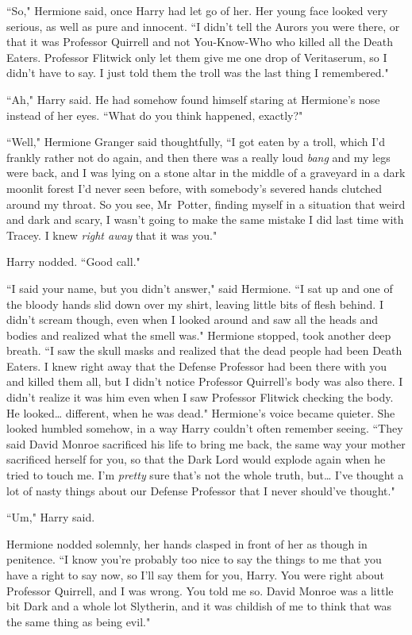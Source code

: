 ``So," Hermione said, once Harry had let go of her. Her young face looked very serious, as well as pure and innocent. ``I didn't tell the Aurors you were there, or that it was Professor Quirrell and not You-Know-Who who killed all the Death Eaters. Professor Flitwick only let them give me one drop of Veritaserum, so I didn't have to say. I just told them the troll was the last thing I remembered."

``Ah," Harry said. He had somehow found himself staring at Hermione's nose instead of her eyes. ``What do you think happened, exactly?"

``Well," Hermione Granger said thoughtfully, ``I got eaten by a troll, which I'd frankly rather not do again, and then there was a really loud \emph{bang} and my legs were back, and I was lying on a stone altar in the middle of a graveyard in a dark moonlit forest I'd never seen before, with somebody's severed hands clutched around my throat. So you see, Mr~Potter, finding myself in a situation that weird and dark and scary, I wasn't going to make the same mistake I did last time with Tracey. I knew \emph{right away} that it was you."

Harry nodded. ``Good call."

``I said your name, but you didn't answer," said Hermione. ``I sat up and one of the bloody hands slid down over my shirt, leaving little bits of flesh behind. I didn't scream though, even when I looked around and saw all the heads and bodies and realized what the smell was." Hermione stopped, took another deep breath. ``I saw the skull masks and realized that the dead people had been Death Eaters. I knew right away that the Defense Professor had been there with you and killed them all, but I didn't notice Professor Quirrell's body was also there. I didn't realize it was him even when I saw Professor Flitwick checking the body. He looked{\ldots} different, when he was dead." Hermione's voice became quieter. She looked humbled somehow, in a way Harry couldn't often remember seeing. ``They said David Monroe sacrificed his life to bring me back, the same way your mother sacrificed herself for you, so that the Dark Lord would explode again when he tried to touch me. I'm \emph{pretty} sure that's not the whole truth, but{\ldots} I've thought a lot of nasty things about our Defense Professor that I never should've thought."

``Um," Harry said.

Hermione nodded solemnly, her hands clasped in front of her as though in penitence. ``I know you're probably too nice to say the things to me that you have a right to say now, so I'll say them for you, Harry. You were right about Professor Quirrell, and I was wrong. You told me so. David Monroe was a little bit Dark and a whole lot Slytherin, and it was childish of me to think that was the same thing as being evil."

